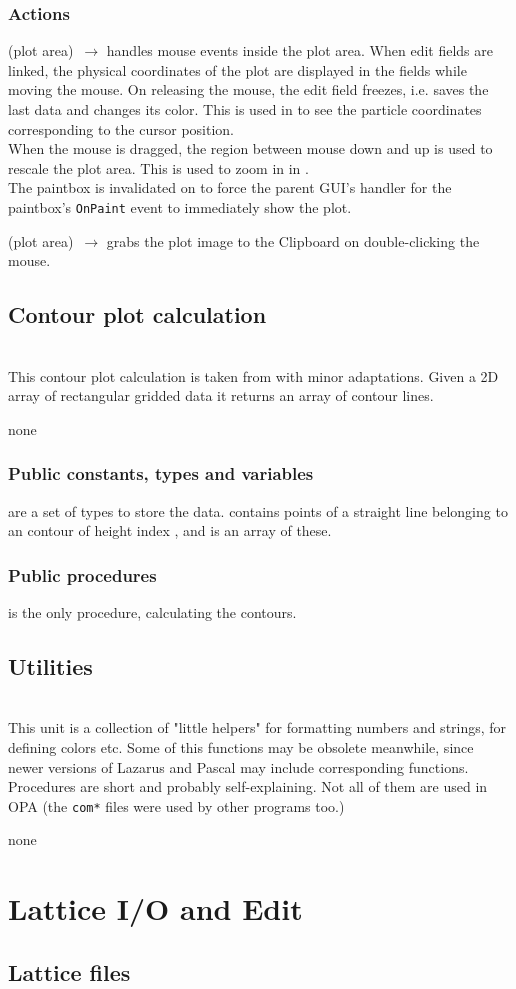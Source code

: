 \documentclass[12pt]{article}
\newcommand\code[1]{{\tt #1}}
\newcommand{\ofldx}[1]{\colorbox{black!15}{{\color{black}(#1)}}}
\newcommand\guifco[1]{{\color{violet}\code{#1}}}
\newcommand{\unico}[1]{{\color{burntorange}\code{#1}}}
\newcommand{\evcodxf}[2]{\ofldx{#1}~$\rightarrow$ \guifco{#2}}
\newcommand{\opagui}[1]{\colorbox{blue!20}{{\color{black}\code{#1}}}}
\newcommand{\ogui}[1]{\hyperref[#1]{\opagui{#1}}}
\newcommand{\opauni}[1]{\colorbox{orange!30}{{\color{black}\code{#1}}}}
\newcommand{\ounih}[2]{\subsection{\label{#2}#1}{\Huge\opauni{#2}}\\}
\newcommand{\uses}[1]{\flushleft {\bf Uses:} #1}
\newcommand{\desc}[1]{#1}
\newcommand{\act}[1]{\subsubsection*{Actions} #1}
\newcommand{\pvar}[1]{\subsubsection*{Public constants, types and variables} #1}
\newcommand{\ppro}[1]{\subsubsection*{Public procedures} #1}
\begin{document}
\act{
\evcodxf{plot area}{pMouseDown,pMouseMove,pMouseUp} handles mouse events inside the plot area.
When edit fields are linked, the physical coordinates of the plot are displayed in the fields while moving the mouse. On releasing the mouse, the edit field freezes, i.e. saves the last data and changes its color.
This is used in \ogui{opatrackps} %
to see the particle coordinates corresponding to the cursor position. \\
When the mouse is dragged, the region between mouse down and up is used to rescale the plot area. This is used to zoom in in \ogui{opageometry}.\\
The paintbox is invalidated on \guifco{MouseMove, Mouseup} to force the parent GUI's handler for the paintbox's \code{OnPaint} event to immediately show the plot.

\evcodxf{plot area}{pDblClick} grabs the plot image to the Clipboard on double-clicking the mouse.
}



\ounih{Contour plot calculation}{comcontourlib}

\desc{This contour plot calculation is taken from \cite{CONRECT} with minor adaptations. Given a 2D array of rectangular gridded data it returns an array of contour lines.}

\uses{none}
\pvar{
\unico{Con...} are a set of types to store the data. \unico{ConLinesType} contains points of a straight line belonging to an contour of height index \unico{ih}, and \unico{ConLinesArray} is an array of these.
}
\ppro{
\unico{Conrec} is the only procedure, calculating the contours.}

\ounih{Utilities}{comauxlib}

\desc{This unit is a collection of "little helpers" for formatting numbers and strings, for defining colors etc. Some of this functions may be obsolete meanwhile, since newer versions of Lazarus and Pascal may include corresponding functions.
Procedures are short and probably self-explaining. Not all of them are used in OPA (the \code{com*} files were used by other programs too.)}

\uses{none}

\section{\label{secedit}Lattice I/O and Edit} 

\ounih{Lattice files}{latfilelib}
\end{document}
